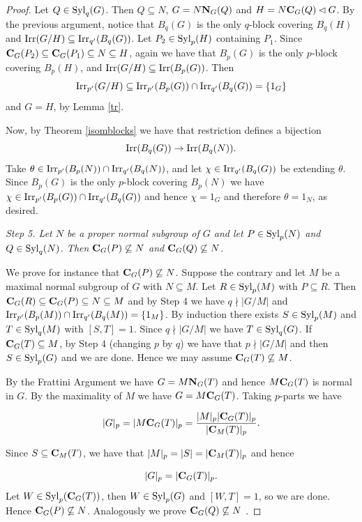 \documentclass[12pt,leqno,a4paper]{amsart}
\def\syl#1#2{{\rm Syl}_#1(#2)}
\def\irr#1{{\rm Irr}(#1)}
\def\norm#1#2{{\bf N}_{#1}(#2)}
\def\cent#1#2{{\bf C}_{#1}(#2)}
\def\sbs{\subseteq}
\theoremstyle{remark}
\begin{document}
\begin{proof}
Let $Q\in{\rm Syl}_{q}(G)$. Then $Q\subseteq N$, $G=N\norm G Q$ and $H=N\cent G Q\lhd G$. By the previous argument,
notice that $B_q(G)$ is the only $q$-block covering $B_q(H)$ and $\irr{G/H} \sbs {\rm Irr}_{q'}(B_q(G))$. 
Let $P_2 \in \syl pH$ containing $P_1$.
Since $\cent G{P_2} \sbs
\cent G {P_1} \subseteq N\subseteq H$, again we have that
$B_p(G)$ is the only $p$-block covering $B_p(H)$, and $\irr{G/H} \sbs \irr{B_p(G)}$. 
Then $${\rm Irr}_{p'}(G/H) \subseteq{\rm Irr}_{p'}(B_p(G))\cap{\rm Irr}_{q'}(B_q(G))=\{1_G\}$$ and $G=H$,
by Lemma \ref{tr}.

 Now, by Theorem \ref{isomblocks}  we have that restriction defines a bijection $${\rm Irr}(B_q(G))\rightarrow{\rm Irr}(B_q(N)).$$ Take $\theta\in{\rm Irr}_{p'}(B_p(N))\cap{\rm Irr}_{q'}(B_q(N))$, and let $\chi\in{\rm Irr}_{q'}(B_q(G))$
 be extending $\theta$. Since $B_p(G)$ is the only $p$-block covering $B_p(N)$ we have $\chi\in{\rm Irr}_{p'}(B_p(G))\cap{\rm Irr}_{q'}(B_q(G))$ and hence $\chi=1_G$ and therefore $\theta=1_N$, as desired.



\medskip

\textit{Step 5. Let $N$ be a proper normal subgroup of $G$ and let $P\in{\rm Syl}_p(N)$ and $Q\in{\rm Syl}_q(N)$. Then $\cent G P\not\subseteq N$ and $\cent G Q\not\subseteq N$. }
\smallskip


We prove for instance
that $\cent G P\not\subseteq N$. Suppose the contrary and let $M$ be a maximal normal subgroup of $G$ with $N\subseteq M$. Let $R\in{\rm Syl}_p(M)$ with $P\subseteq R$. Then $\cent G R\subseteq\cent G P\subseteq N\subseteq M$ and by Step 4 we have $q\nmid |G/M|$ and ${\rm Irr}_{p'}(B_p(M))\cap {\rm Irr}_{q'}(B_q(M))=\{1_M\}$. By induction there exists $S\in{\rm Syl}_p(M)$ and $T\in{\rm Syl}_q(M)$ with $[S,T]=1$. Since $q\nmid |G/M|$ we have $T\in{\rm Syl}_q(G)$. If $\cent G T\subseteq M$, by Step 4 (changing $p$ by $q$) we have that $p\nmid |G/M|$ and then $S\in{\rm Syl}_p(G)$ and we are done.  Hence we may assume $\cent G T\not\subseteq M$.

By the Frattini Argument we have $G=M\norm G T$ and hence $M\cent G T$ is normal in $G$. By the maximality of $M$ we have $G=M\cent G T$. Taking $p$-parts we have 

$$|G|_p=|M\cent G T|_p=\frac{|M|_p|\cent G T|_p}{|\cent M T|_p}.$$

Since $S\subseteq\cent M T$, we have that $|M|_p=|S|=|\cent M T|_p$ and hence

$$|G|_p= |\cent G T|_p.$$ Let $W\in{\rm Syl}_p(\cent G T)$, then  $W\in{\rm Syl}_p(G)$ and $[W,T]=1$, so we are done. Hence $\cent G P\not\subseteq N$. Analogously we prove $\cent G Q\not\subseteq N$ .


\end{proof}
\end{document}
